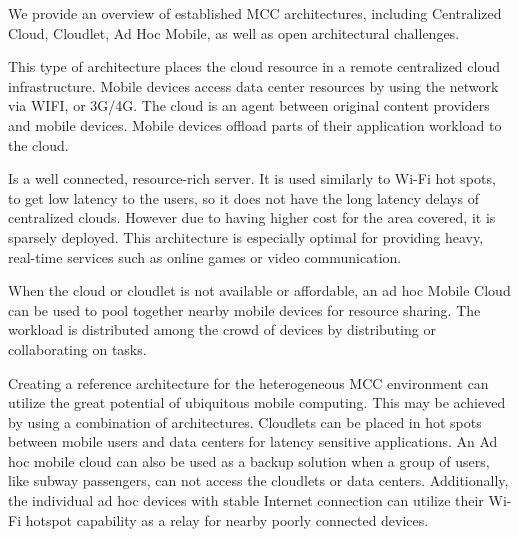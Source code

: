 We provide an overview of established MCC architectures, including Centralized Cloud, Cloudlet, Ad Hoc Mobile, as well as open architectural challenges.
\begin{description}[style=nextline]
\item [Centralized Cloud]
This type of architecture places the cloud resource in a remote centralized cloud infrastructure\cite[p.3]{liu2013gearing}. Mobile devices access data center resources by using the network via WIFI, or 3G/4G. The cloud is an agent between original content providers and mobile devices. Mobile devices offload parts of their application workload to the cloud.
\item [Cloudlet]
Is a well connected, resource-rich server\cite[p.3-4]{liu2013gearing}. It is used similarly to Wi-Fi hot spots, to get low latency to the users, so it does not have the long latency delays of centralized clouds. However due to having higher cost for the area covered, it is sparsely deployed. This architecture is especially optimal for providing heavy, real-time services such as online games or video communication.
\item [ad hoc Mobile Cloud]
When the cloud or cloudlet is not available or affordable, an ad hoc Mobile Cloud can be used to pool together nearby mobile devices for resource sharing\cite[p.4]{liu2013gearing}. The workload is distributed among the crowd of devices by distributing or collaborating on tasks.
\item [Architectural Challenges]
Creating a reference architecture for the heterogeneous MCC environment can utilize the great potential of ubiquitous mobile computing\cite{sanaei2014heterogeneity}. This may be achieved by using a combination of architectures. Cloudlets can be placed in hot spots between mobile users and data centers for latency sensitive applications. An Ad hoc mobile cloud can also be used as a backup solution when a group of users, like subway passengers, can not access the cloudlets or data centers. Additionally, the individual ad hoc devices with stable Internet connection can utilize their Wi-Fi hotspot capability as a relay for nearby poorly connected devices.




\end{description}